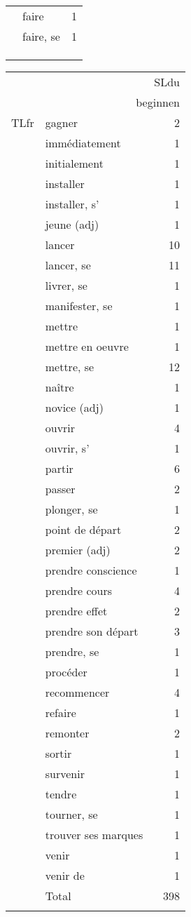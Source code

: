 {\begin{tabularx}{.45\textwidth}{llr}
& faire &  1\\
& faire, se &  1\\
\\
\\
\\
\end{tabularx}
\begin{tabularx}{.45\textwidth}{llr} 
&& SLdu\\
\hhline{~~-} &\multicolumn{2}{r}{beginnen}\\
\multicolumn{1}{c}{TLfr}
& gagner &  2\\
& immédiatement &  1\\
& initialement &  1\\
& installer &  1\\
& installer, s' &  1\\
& jeune (adj) &  1\\
& lancer &  10\\
& lancer, se &  11\\
& livrer, se &  1\\
& manifester, se &  1\\
& mettre &  1\\
& mettre en oeuvre &  1\\
& mettre, se &  12\\
& naître &  1\\
& novice (adj) &  1\\
& ouvrir &  4\\
& ouvrir, s' &  1\\
& partir &  6\\
& passer &  2\\
& plonger, se &  1\\
& point de départ &  2\\
& premier (adj) &  2\\
& prendre conscience &  1\\
& prendre cours &  4\\
& prendre effet &  2\\
& prendre son départ &  3\\
& prendre, se &  1\\
& procéder &  1\\
& recommencer &  4\\
& refaire &  1\\
& remonter &  2\\
& sortir &  1\\
& survenir &  1\\
& tendre &  1\\
& tourner, se &  1\\
& trouver ses marques &  1\\
& venir &  1\\
& venir de &  1\\
\midrule 
& {Total} &  398\\
\lspbottomrule
\end{tabularx}
}

